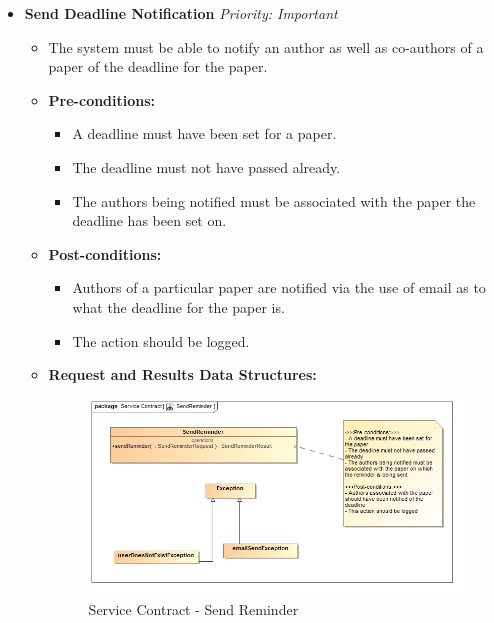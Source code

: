 \documentclass{article}
\begin{document}
				\begin{itemize}
					\item \textbf{Send Deadline Notification} \hfill \textit{Priority: Important}
					\begin{itemize}
						\item The system must be able to notify an author as well as co-authors of a paper of the deadline for the paper.
						\item \textbf{Pre-conditions:}
						\begin{itemize}
							\item A deadline must have been set for a paper.
							\item The deadline must not have passed already.
							\item The authors being notified must be associated with the paper the deadline has been set on.
						\end{itemize}
						\item \textbf{Post-conditions:}
						\begin{itemize}
							\item Authors of a particular paper are notified via the use of email as to what the deadline for the paper is.
							\item The action should be logged.
						\end{itemize}
						\item \textbf{Request and Results Data Structures:}
						\begin{figure}[H]
							\includegraphics[width=\linewidth]{../Diagrams/SendReminder.jpg}
							\caption{Service Contract - Send Reminder}
						\end{figure}
					\end{itemize}
				\end{itemize}
\end{document}
